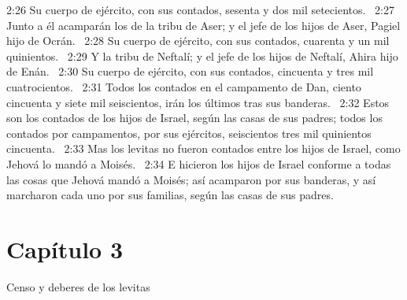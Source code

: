 2:26 Su cuerpo de ejército, con sus contados, sesenta y dos mil setecientos.  
2:27 Junto a él acamparán los de la tribu de Aser; y el jefe de los hijos de Aser, Pagiel hijo de Ocrán.  
2:28 Su cuerpo de ejército, con sus contados, cuarenta y un mil quinientos.  
2:29 Y la tribu de Neftalí; y el jefe de los hijos de Neftalí, Ahira hijo de Enán.  
2:30 Su cuerpo de ejército, con sus contados, cincuenta y tres mil cuatrocientos.  
2:31 Todos los contados en el campamento de Dan, ciento cincuenta y siete mil seiscientos, irán los últimos tras sus banderas.  
2:32 Estos son los contados de los hijos de Israel, según las casas de sus padres; todos los contados por campamentos, por sus ejércitos, seiscientos tres mil quinientos cincuenta.  
2:33 Mas los levitas no fueron contados entre los hijos de Israel, como Jehová lo mandó a Moisés.  
2:34 E hicieron los hijos de Israel conforme a todas las cosas que Jehová mandó a Moisés; así acamparon por sus banderas, y así marcharon cada uno por sus familias, según las casas de sus padres.  
\section*{Capítulo 3}
Censo y deberes de los levitas  

